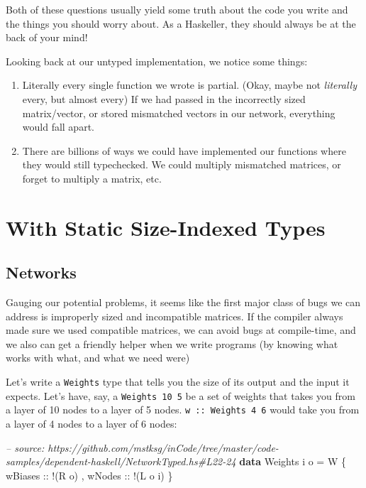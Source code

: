 \documentclass[]{article}
\newenvironment{Shaded}{}{}
\newcommand{\KeywordTok}[1]{\textcolor[rgb]{0.00,0.44,0.13}{\textbf{{#1}}}}
\newcommand{\DataTypeTok}[1]{\textcolor[rgb]{0.56,0.13,0.00}{{#1}}}
\newcommand{\CommentTok}[1]{\textcolor[rgb]{0.38,0.63,0.69}{\textit{{#1}}}}
\newcommand{\OtherTok}[1]{\textcolor[rgb]{0.00,0.44,0.13}{{#1}}}
\newcommand{\FunctionTok}[1]{\textcolor[rgb]{0.02,0.16,0.49}{{#1}}}
\newcommand{\NormalTok}[1]{{#1}}
\begin{document}
Both of these questions usually yield some truth about the code you
write and the things you should worry about. As a Haskeller, they should
always be at the back of your mind!

Looking back at our untyped implementation, we notice some things:

\begin{enumerate}
\def\labelenumi{\arabic{enumi}.}
\tightlist
\item
  Literally every single function we wrote is partial. (Okay, maybe not
  \emph{literally} every, but almost every) If we had passed in the
  incorrectly sized matrix/vector, or stored mismatched vectors in our
  network, everything would fall apart.
\item
  There are billions of ways we could have implemented our functions
  where they would still typechecked. We could multiply mismatched
  matrices, or forget to multiply a matrix, etc.
\end{enumerate}

\section{With Static Size-Indexed
Types}\label{with-static-size-indexed-types}

\subsection{Networks}\label{networks}

Gauging our potential problems, it seems like the first major class of
bugs we can address is improperly sized and incompatible matrices. If
the compiler always made sure we used compatible matrices, we can avoid
bugs at compile-time, and we also can get a friendly helper when we
write programs (by knowing what works with what, and what we need were)

Let's write a \texttt{Weights} type that tells you the size of its
output and the input it expects. Let's have, say, a
\texttt{Weights\ 10\ 5} be a set of weights that takes you from a layer
of 10 nodes to a layer of 5 nodes. \texttt{w\ ::\ Weights\ 4\ 6} would
take you from a layer of 4 nodes to a layer of 6 nodes:

\begin{Shaded}
\begin{Highlighting}[]
\CommentTok{-- source: https://github.com/mstksg/inCode/tree/master/code-samples/dependent-haskell/NetworkTyped.hs#L22-24}
\KeywordTok{data} \DataTypeTok{Weights} \NormalTok{i o }\FunctionTok{=} \DataTypeTok{W} \NormalTok{\{}\OtherTok{ wBiases ::} \FunctionTok{!}\NormalTok{(}\DataTypeTok{R} \NormalTok{o)}
                     \NormalTok{,}\OtherTok{ wNodes  ::} \FunctionTok{!}\NormalTok{(}\DataTypeTok{L} \NormalTok{o i)}
                     \NormalTok{\}}
\end{Highlighting}
\end{Shaded}
\end{document}
